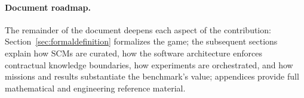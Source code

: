 \paragraph{Document roadmap.}
The remainder of the document deepens each aspect of the contribution: Section~\ref{sec:formaldefinition} formalizes the game; the subsequent sections explain how SCMs are curated, how the software architecture enforces contractual knowledge boundaries, how experiments are orchestrated, and how missions and results substantiate the benchmark’s value; appendices provide full mathematical and engineering reference material.
